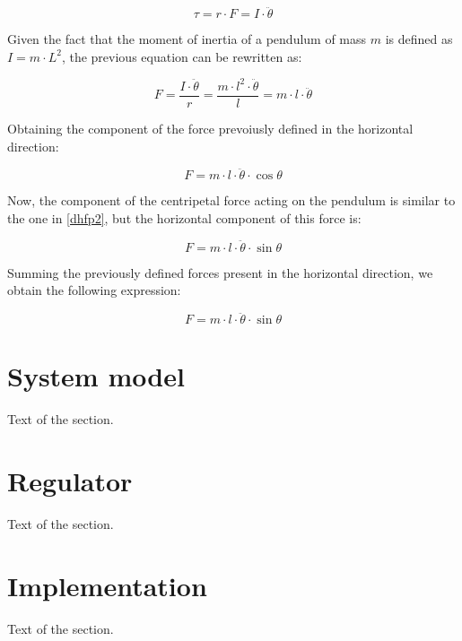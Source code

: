 \documentclass{article}
\begin{document}
\begin{equation} \label{dhfp}
\tau=r\cdot F=I\cdot \ddot{\theta}
\end{equation}

Given the fact that the moment of inertia of a pendulum of mass $m$ is defined as $I=m\cdot L^2$, the previous equation can be rewritten as:

\begin{equation} \label{dhfp2}
F=\frac{I\cdot \ddot{\theta}}{r}=\frac{m\cdot l^2\cdot \ddot{\theta}}{l}=m\cdot l\cdot \ddot{\theta}
\end{equation}

Obtaining the component of the force prevoiusly defined in the horizontal direction:

\begin{equation} \label{sfph}
F=m\cdot l\cdot \ddot{\theta}\cdot \cos{\theta}
\end{equation}

Now, the component of the centripetal force acting on the pendulum is similar to the one in \ref{dhfp2}, but the horizontal component of this force is:

\begin{equation} \label{scfph}
F=m\cdot l\cdot \ddot{\theta}\cdot \sin{\theta}
\end{equation}

Summing the previously defined forces present in the horizontal direction, we obtain the following expression:

\begin{equation} \label{scfph}
F=m\cdot l\cdot \ddot{\theta}\cdot \sin{\theta}
\end{equation}

\section{System model}

Text of the section.

\section{Regulator}

Text of the section.

\section{Implementation}

Text of the section.

\begin{appendix}
	\newpage
	\listoffigures
	\newpage
	\listoftables
\end{appendix}

\newpage
\printbibliography
\end{document}
